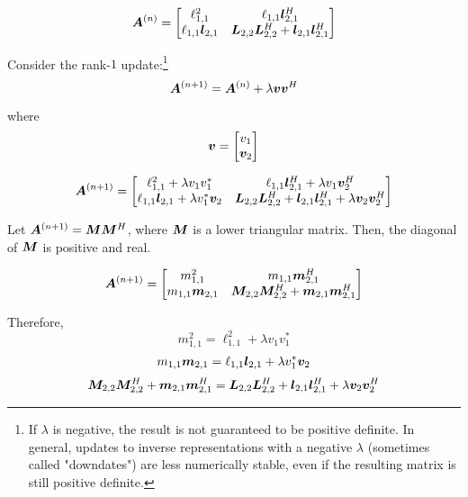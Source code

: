 \begin{appendices}
\begin{equation}
\bm{A}^{(n)} = \begin{bmatrix} \ell_{1,1}^2 & \ell_{1,1}\bm{l}_{2,1}^H \\ \ell_{1,1}\bm{l}_{2,1} & \bm{L}_{2,2}\bm{L}_{2,2}^H + \bm{l}_{2,1}\bm{l}_{2,1}^H \end{bmatrix}
\end{equation}

Consider the rank-$1$ update:\footnote{If $\lambda$ is negative, the result is not guaranteed to be positive definite. In general, updates to inverse representations with a negative $\lambda$ (sometimes called "downdates") are less numerically stable, even if the resulting matrix is still positive definite.}
\begin{equation}
\bm{A}^{(n + 1)} = \bm{A}^{(n)} + \lambda\bm{v}\bm{v}^H
\end{equation}

where
\begin{equation}
\bm{v} = \begin{bmatrix} v_1 \\ \bm{v}_2 \end{bmatrix}
\end{equation}

\begin{equation}
\bm{A}^{(n + 1)} = \begin{bmatrix} \ell_{1,1}^2 + \lambda v_1 v_1^{*} & \ell_{1,1}\bm{l}_{2,1}^H + \lambda v_1\bm{v}_2^H \\ \ell_{1,1}\bm{l}_{2,1} + \lambda v_1^{*}\bm{v}_2 & \bm{L}_{2,2}\bm{L}_{2,2}^H + \bm{l}_{2,1}\bm{l}_{2,1}^H + \lambda\bm{v}_2\bm{v}_2^H \end{bmatrix}
\end{equation}

Let $\bm{A}^{(n + 1)} = \bm{M}\bm{M}^H$, where $\bm{M}$ is a lower triangular matrix. Then, the diagonal of $\bm{M}$ is positive and real.

\begin{equation}
\bm{A}^{(n + 1)} = \begin{bmatrix} m_{1,1}^2 & m_{1,1}\bm{m}_{2,1}^H \\ m_{1,1}\bm{m}_{2,1} & \bm{M}_{2,2}\bm{M}_{2,2}^H + \bm{m}_{2,1}\bm{m}_{2,1}^H \end{bmatrix}
\end{equation}

Therefore,
\begin{equation}
m_{1,1}^2 = \ell_{1,1}^2 + \lambda v_1 v_1^{*}
\end{equation}
\begin{equation}
m_{1,1}\bm{m}_{2,1} = \ell_{1,1}\bm{l}_{2,1} + \lambda v_1^{*}\bm{v}_2
\end{equation}
\begin{equation}
\bm{M}_{2,2}\bm{M}_{2,2}^H + \bm{m}_{2,1}\bm{m}_{2,1}^H = \bm{L}_{2,2}\bm{L}_{2,2}^H + \bm{l}_{2,1}\bm{l}_{2,1}^H + \lambda\bm{v}_2\bm{v}_2^H
\end{equation}


\end{appendices}
